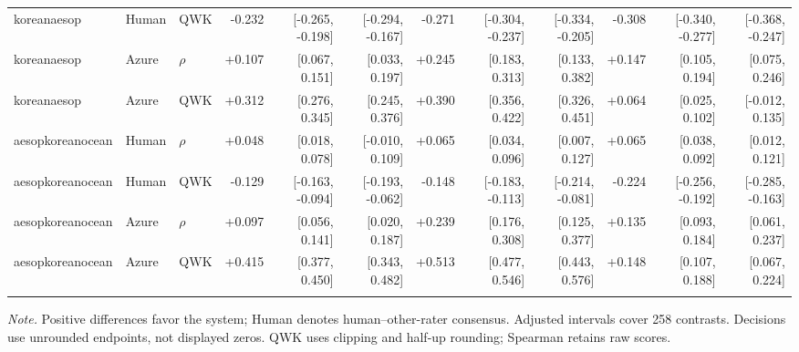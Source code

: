 \documentclass[10pt]{article}
\begin{document}
\begin{landscape}
\begin{longtable}{@{}lllrrrrrrrrr@{}}
koreanaesop & Human & QWK & -0.232 & [-0.265, -0.198] & [-0.294, -0.167] & -0.271 & [-0.304, -0.237] & [-0.334, -0.205] & -0.308 & [-0.340, -0.277] & [-0.368, -0.247]\\
koreanaesop & Azure & $\rho$ & +0.107 & [0.067, 0.151] & [0.033, 0.197] & +0.245 & [0.183, 0.313] & [0.133, 0.382] & +0.147 & [0.105, 0.194] & [0.075, 0.246]\\
koreanaesop & Azure & QWK & +0.312 & [0.276, 0.345] & [0.245, 0.376] & +0.390 & [0.356, 0.422] & [0.326, 0.451] & +0.064 & [0.025, 0.102] & [-0.012, 0.135]\\
\addlinespace[2pt]
aesopkoreanocean & Human & $\rho$ & +0.048 & [0.018, 0.078] & [-0.010, 0.109] & +0.065 & [0.034, 0.096] & [0.007, 0.127] & +0.065 & [0.038, 0.092] & [0.012, 0.121]\\
aesopkoreanocean & Human & QWK & -0.129 & [-0.163, -0.094] & [-0.193, -0.062] & -0.148 & [-0.183, -0.113] & [-0.214, -0.081] & -0.224 & [-0.256, -0.192] & [-0.285, -0.163]\\
aesopkoreanocean & Azure & $\rho$ & +0.097 & [0.056, 0.141] & [0.020, 0.187] & +0.239 & [0.176, 0.308] & [0.125, 0.377] & +0.135 & [0.093, 0.184] & [0.061, 0.237]\\
aesopkoreanocean & Azure & QWK & +0.415 & [0.377, 0.450] & [0.343, 0.482] & +0.513 & [0.477, 0.546] & [0.443, 0.576] & +0.148 & [0.107, 0.188] & [0.067, 0.224]\\
\addlinespace[2pt]
\end{longtable}
\noindent\textit{Note.} Positive differences favor the system; Human denotes human--other-rater consensus. Adjusted intervals cover 258 contrasts. Decisions use unrounded endpoints, not displayed zeros. QWK uses clipping and half-up rounding; Spearman retains raw scores.
\endgroup
\end{landscape}
\end{document}
